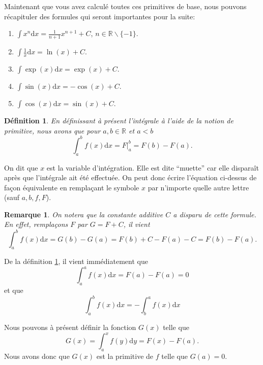 \documentclass[a4paper,12pt]{book}
\newcommand{\real}{\mathbb{R}}
\newcommand{\dd}{\mathrm{d}}
\newtheorem{definition}{Définition}
\newtheorem*{remarque}{Remarque}
\begin{document}
Maintenant que vous avez calculé toutes ces primitives de base, nous pouvons récapituler 
des formules qui seront importantes pour la suite:
 \begin{enumerate}
  \item $\int x^n\dd x=\frac{1}{n+1}x^{n+1}+C$, $n\in \real\backslash\{-1\}$.
  \item $\int \frac{1}{x}\dd x=\ln(x)+C$.
  \item $\int \exp(x)\dd x=\exp(x)+C$.
  \item $\int \sin(x)\dd x=-\cos(x)+C$.
  \item $\int \cos(x)\dd x=\sin(x)+C$.
 \end{enumerate}

\begin{definition}\label{def_prim}
En définissant à présent l'intégrale à l'aide de la notion de primitive, nous avons
que pour $a,b\in\real$ et $a<b$
\begin{equation}
 \int_a^b f(x)\dd x=\left.F\right|_a^b=F(b)-F(a).
\end{equation}
\end{definition}
On dit que $x$ est la variable d'intégration. Elle est dite ``muette'' car elle disparaît après que l'intégrale ait été effectuée.
On peut donc écrire l'équation ci-dessus de façon équivalente en remplaçant le symbole $x$ par n'importe quelle autre lettre (sauf $a,b,f,F$).
\begin{remarque}
 On notera que la constante additive $C$ a disparu de cette formule. En effet, remplaçons $F$ par $G=F+C$, il vient
\begin{equation*}
 \int_a^b f(x)\dd x=G(b)-G(a)=F(b)+C-F(a)-C=F(b)-F(a). 
\end{equation*}
\end{remarque}
De la définition \ref{def_prim}, il vient immédiatement que 
\begin{equation}
 \int_a^af(x)\dd x=F(a)-F(a)=0
\end{equation}
et que
\begin{equation}
 \int_a^bf(x)\dd x= -\int_b^af(x)\dd x
\end{equation}

Nous pouvons à présent définir la fonction $G(x)$ telle que
\begin{equation}
 G(x)=\int_a^xf(y)\dd y=F(x)-F(a).
\end{equation}
Nous avons donc que $G(x)$ est la primitive de $f$ telle que $G(a)=0$.
\end{document}
